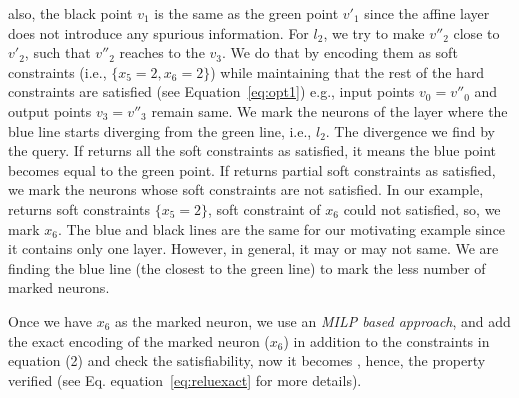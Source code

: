 also, the black point $v_1$ is the same as the green point $v'_1$ since the affine layer does not introduce any spurious information. 
For $l_2$, we try to make $v''_2$ close to $v'_2$, such that $v''_2$ reaches to the $v_3$. We do that by encoding 
them as soft constraints (i.e.,  $\{x_5=2, x_6=2\}$) 
while maintaining that the rest of the hard constraints are satisfied (see Equation~\ref{eq:opt1})
e.g., input points $v_0=v''_0$ and output points $v_3=v''_3$ remain same. 
We mark the neurons of the layer where the blue line starts diverging from the green line, i.e., $l_2$. 
The divergence we find by the \maxsat{} query. If \maxsat{} returns all the soft constraints as satisfied, it means
the blue point becomes equal to the green point. If \maxsat{} returns partial soft constraints as satisfied, 
we mark the neurons whose soft constraints are not satisfied. In our example, \maxsat{} returns 
soft constraints $\{x_5=2\}$, soft constraint of $x_6$ could not satisfied, so, we mark $x_6$.
The blue and black lines are the same for our motivating example since it contains only one \relu{} layer. 
However, in general, it may or may not same. We are finding the blue line (the closest to the green line) to mark the 
less number of marked neurons. 




  
  \qquad 
  \begin{minipage}{0.4\linewidth}
Once we have  $x_6$ as the marked neuron, we use an {\em MILP based approach}, and add the exact encoding of the marked neuron ($x_6$) in addition to the constraints in equation (2) %
and check the satisfiability, now it becomes \unsat{}, hence, the property verified (see Eq. equation~\ref{eq:reluexact} for more details).
\end{minipage}


